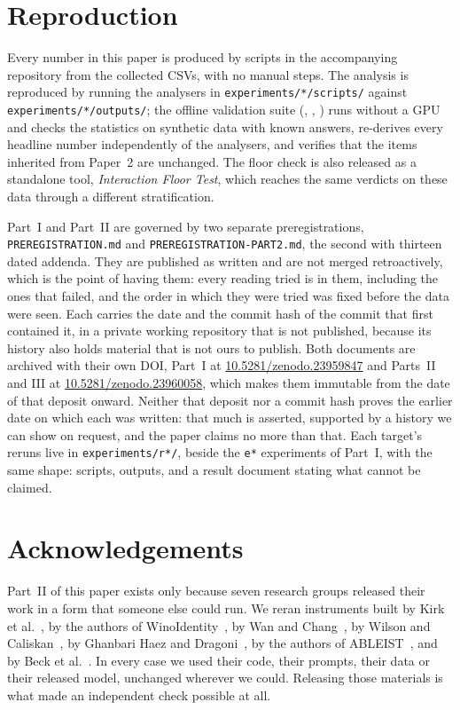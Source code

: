 \documentclass[11pt]{article}
\begin{document}
\section{Reproduction}

Every number in this paper is produced by scripts in the accompanying
repository from the collected CSVs, with no manual steps. The analysis is
reproduced by running the analysers in \texttt{experiments/*/scripts/} against
\texttt{experiments/*/outputs/}; the offline validation suite
(\mbox{}, ,
) runs without a GPU and checks the statistics on
synthetic data with known answers, re-derives every headline number
independently of the analysers, and verifies that the items inherited from
Paper~2 are unchanged. The floor check is also released as a standalone tool,
\emph{Interaction Floor Test}, which reaches the same verdicts on these data
through a different stratification.

Part~I and Part~II are governed by two separate preregistrations,
\texttt{PREREGISTRATION.md} and \texttt{PREREGISTRATION-PART2.md}, the second
with thirteen dated addenda. They are published as written and are not merged
retroactively, which is the point of having them: every reading tried is in
them, including the ones that failed, and the order in which they were tried was
fixed before the data were seen. Each carries the date and the commit hash of the commit that first contained
it, in a private working repository that is not published, because its history
also holds material that is not ours to publish. Both documents are archived with their own DOI, Part~I at
\href{https://doi.org/10.5281/zenodo.23959847}{10.5281/zenodo.23959847} and
Parts~II and III at \href{https://doi.org/10.5281/zenodo.23960058}{10.5281/zenodo.23960058},
which makes them immutable from the date of that deposit onward. Neither that deposit nor a commit hash proves the earlier date on which
each was written: that much is asserted, supported by a history we can show on
request, and the paper claims no more than that. Each target's reruns live in
\texttt{experiments/r*/}, beside the \texttt{e*} experiments of Part~I, with the
same shape: scripts, outputs, and a result document stating what cannot be
claimed.

\section*{Acknowledgements}

Part~II of this paper exists only because seven research groups released their
work in a form that someone else could run. We reran instruments built by Kirk
et al.~\cite{kirk2021}, by the authors of WinoIdentity~\cite{winoidentity2025},
by Wan and Chang~\cite{wan2025}, by Wilson and Caliskan~\cite{wilson2024}, by
Ghanbari Haez and Dragoni~\cite{ghanbari2025}, by the authors of
ABLEIST~\cite{ableist2025}, and by Beck et al.~\cite{beck2024}. In every case we
used their code, their prompts, their data or their released model, unchanged
wherever we could. Releasing those materials is what made an independent check possible at all.
\end{document}

